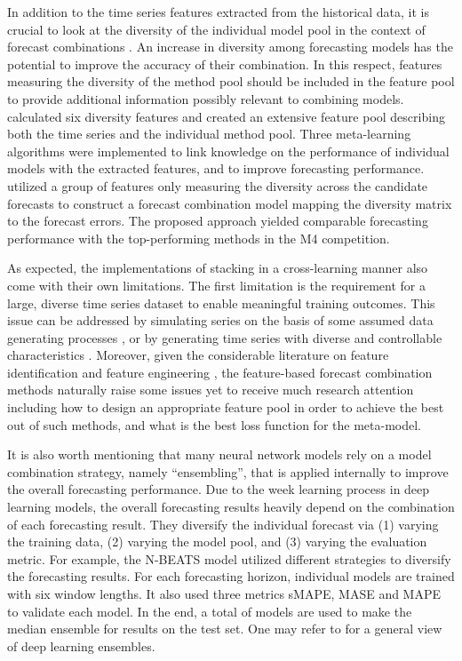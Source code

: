 \documentclass[11pt]{article}
\newcommand{\pkg}[1]{{\normalfont\fontseries{b}\selectfont #1}}
\let\proglang=\textsf
\begin{document}
In addition to the time series features extracted from the historical data, it is crucial to look at the diversity of the individual model pool in the context of forecast combinations \citep{Batchelor1995-ps,Thomson2019-al,Atiya2020-ge,Lichtendahl2020-ut}. An increase in diversity among forecasting models has the potential to improve the accuracy of their combination. In this respect, features measuring the diversity of the method pool should be included in the feature pool to provide additional information possibly relevant to combining models. \citet{Lemke2010-wn} calculated six diversity features and created an extensive feature pool describing both the time series and the individual method pool. Three meta-learning algorithms were implemented to link knowledge on the performance of individual models with the extracted features, and to improve forecasting performance. \citet{Kang2021-ol} utilized a group of features only measuring the diversity across the candidate forecasts to construct a forecast combination model mapping the diversity matrix to the forecast errors. The proposed approach yielded comparable forecasting performance with the top-performing methods in the M4 competition.

As expected, the implementations of stacking in a cross-learning manner also come with their own limitations. The first limitation is the requirement for a large, diverse time series dataset to enable meaningful training outcomes. This issue can be addressed by simulating series on the basis of some assumed data generating processes \citep{talagala2018meta} \citep[implemented using the \proglang{R} package \pkg{forecast},][]{rforecast}, or by generating time series with diverse and controllable characteristics \citep{Kang2020-rl} \citep[implemented in the \proglang{R} package \pkg{gratis},][]{rgratis}. Moreover, given the considerable literature on feature identification and feature engineering \citep[e.g.,][]{Wang2009-hs,Kang2017-wt,Lemke2010-wn,Montero-Manso2020-tq,Li2020-od}, the feature-based forecast combination methods naturally raise some issues yet to receive much research attention including how to design an appropriate feature pool in order to achieve the best out of such methods, and what is the best loss function for the meta-model.

It is also worth mentioning that many neural network models rely on a model combination strategy, namely ``ensembling'', that is applied internally to improve the overall forecasting performance. Due to the week learning process in deep learning models, the overall forecasting results heavily depend on the combination of each forecasting result. They diversify the individual forecast via (1) varying the training data, (2) varying the model pool, and (3) varying the evaluation metric. For example, the N-BEATS model \citep{oreshkin2019n}  utilized different strategies to diversify the forecasting results. For each forecasting horizon, individual models are trained with six window lengths. It also used three metrics sMAPE, MASE and MAPE to validate each model. In the end, a total of models are used to make the median ensemble for results on the test set. One may refer to \citet{ganaie2021ensemble} for a general view of deep learning ensembles.
\end{document}
